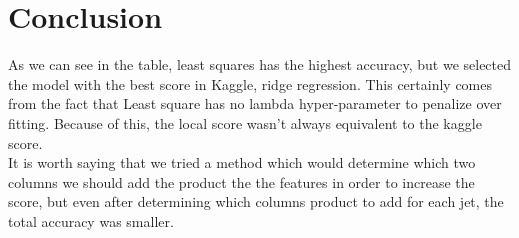 \documentclass[a4paper]{article}
\begin{document}
\section{Conclusion}
As we can see in the table, least squares has the highest accuracy, but we selected the model with the best score in Kaggle, ridge regression. This certainly comes from the fact that Least square has no lambda hyper-parameter to penalize over fitting. Because of this, the local score wasn't always equivalent to the kaggle score.\\

It is worth saying that we tried a method which would determine which two columns we should add the product the the features in order to increase the score, but even after determining which columns product to add for each jet, the total accuracy was smaller.
\end{document}
